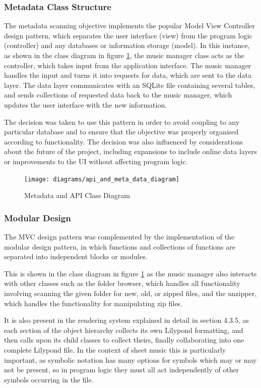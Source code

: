 \subsubsection{Metadata Class Structure}
The metadata scanning objective implements the popular Model View Controller design pattern, which separates the user interface (view) from the program logic (controller) and any databases or information storage (model). %
In this instance, as shown in the class diagram in figure \ref{fig:metadiagram}, the music manager class acts as the controller, which takes input from the application interface. The music manager handles the input and turns it into requests for data, which are sent to the data layer. The data layer communicates with an SQLite file containing several tables, and sends collections of requested data back to the music manager, which updates the user interface with the new information.

The decision was taken to use this pattern in order to avoid coupling to any particular database and to ensure that the objective was properly organised according to functionality. The decision was also influenced by considerations about the future of the project, including expansions to include online data layers or improvements to the UI without affecting program logic.

\begin{figure}[H]
    \centering
    \texttt{[image: diagrams/api\_and\_meta\_data\_diagram]}
    \caption{Metadata and API Class Diagram}
    \label{fig:metadiagram}
\end{figure}

\subsubsection{Modular Design}
The MVC design pattern was complemented by the implementation of the  modular design pattern, in which functions and collections of functions are separated into independent blocks or modules. %

This is shown in the class diagram in figure \ref{fig:metadiagram} as the music manager also interacts with other classes such as the folder browser, which handles all functionality involving scanning the given folder for new, old, or zipped files, and the unzipper, which handles the functionality for manipulating zip files.

It is also present in the rendering system explained in detail in section 4.3.5, as each section of the object hierarchy collects its own Lilypond formatting, and then calls upon its child classes to collect theirs, finally collaborating into one complete Lilypond file. In the context of sheet music this is particularly important, as symbolic notation has many options for symbols which may or may not be present, so in program logic they must all act independently of other symbols occurring in the file.

